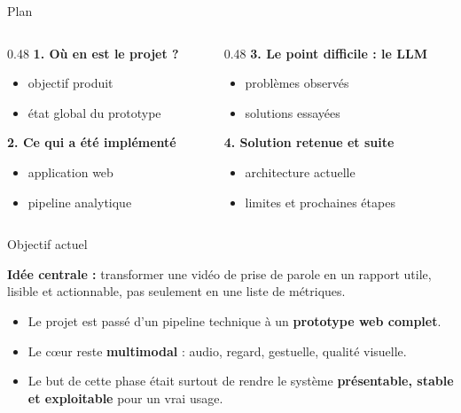 ﻿\documentclass[10pt,aspectratio=169]{beamer}
\begin{document}
\begin{frame}{Plan}
\begin{columns}[T]
\begin{column}{0.48\textwidth}
\textbf{1. Où en est le projet ?}
\begin{itemize}
    \item objectif produit
    \item état global du prototype
\end{itemize}
\vspace{0.3cm}
\textbf{2. Ce qui a été implémenté}
\begin{itemize}
    \item application web
    \item pipeline analytique
\end{itemize}
\end{column}
\begin{column}{0.48\textwidth}
\textbf{3. Le point difficile : le LLM}
\begin{itemize}
    \item problèmes observés
    \item solutions essayées
\end{itemize}
\vspace{0.3cm}
\textbf{4. Solution retenue et suite}
\begin{itemize}
    \item architecture actuelle
    \item limites et prochaines étapes
\end{itemize}
\end{column}
\end{columns}
\end{frame}

\begin{frame}{Objectif actuel}
\begin{keybox}
\textbf{Idée centrale :} transformer une vidéo de prise de parole en un rapport utile, lisible et actionnable, pas seulement en une liste de métriques.
\end{keybox}
\vspace{0.35cm}
\begin{itemize}
    \item Le projet est passé d'un pipeline technique à un \textbf{prototype web complet}.
    \item Le cœur reste \textbf{multimodal} : audio, regard, gestuelle, qualité visuelle.
    \item Le but de cette phase était surtout de rendre le système \textbf{présentable, stable et exploitable} pour un vrai usage.
\end{itemize}
\vspace{0.3cm}
\end{frame}
\end{document}
